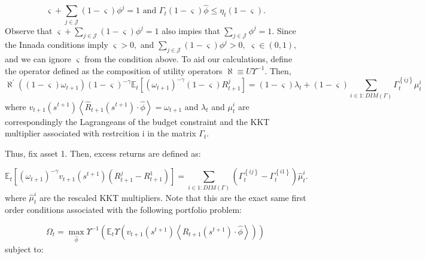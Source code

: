 \documentclass{article}
\begin{document}
\begin{equation*}
\varsigma +\sum_{j\in \mathcal{J}}\left( 1-\varsigma \right) \phi ^{j}=1%
\text{ and }\Gamma _{t}\left( 1-\varsigma \right) \hat{\phi}\leq \eta
_{t}\left( 1-\varsigma \right) .
\end{equation*}%
Observe that $\varsigma +\sum_{j\in \mathcal{J}}\left( 1-\varsigma \right)
\phi ^{j}=1$ also impies that $\sum_{j\in \mathcal{J}}\phi ^{j}=1.$ Since
the Innada conditions imply $\varsigma >0,$ and $\sum_{j\in \mathcal{J}%
}\left( 1-\varsigma \right) \phi ^{j}>0,$ $\varsigma \in \left( 0,1\right) ,$
and we can ignore $\varsigma $ from the condition above. To aid our
calculations, define the operator defined as the composition of utility
operators $\aleph \equiv U\Upsilon ^{-1}.$ Then,
\begin{equation*}
\aleph ^{\prime }\left( \left( 1-\varsigma \right) \omega _{t+1}\right)
\left( 1-\varsigma \right) ^{-\gamma }\mathbb{E}_{t}\left[ \left( \omega
_{t+1}\right) ^{-\gamma }\left( 1-\varsigma \right) R_{t+1}^{j}\right]
=\left( 1-\varsigma \right) \lambda _{t}+\left( 1-\varsigma \right)
\sum_{i\in 1:DIM\left( \Gamma \right) }\Gamma _{t}^{\left\{ ij\right\} }\mu
_{t}^{i}
\end{equation*}%
where $v_{t+1}\left( s^{t+1}\right) \left\langle \hat{R}_{t+1}\left(
s^{t+1}\right) \cdot \hat{\phi}\right\rangle =\omega _{t+1}$ and $\lambda
_{t}$ and $\mu _{t}^{i}$ are correspondingly the Lagrangeans of the budget
constraint and the KKT multiplier associated with restrcition i in the
matrix $\Gamma _{t}$.

Thus, fix asset 1. Then, excess returns are defined as:

\begin{equation*}
\mathbb{E}_{t}\left[ \left( \omega _{t+1}\right) ^{-\gamma }v_{t+1}\left(
s^{t+1}\right) \left( R_{t+1}^{j}-R_{t+1}^{1}\right) \right] =\sum_{i\in
1:DIM\left( \Gamma \right) }\left( \Gamma _{t}^{\left\{ ij\right\} }-\Gamma
_{t}^{\left\{ i1\right\} }\right) \hat{\mu}_{t}^{i}.
\end{equation*}%
where $\hat{\mu}_{t}^{i}$ are the rescaled KKT multipliers. Note that this
are the exact same first order conditions associated with the following
portfolio problem:

\begin{equation*}
\Omega _{t}=\max_{\hat{\phi}}\Upsilon ^{-1}\left( \mathbb{E}_{t}\Upsilon
\left( v_{t+1}\left( s^{t+1}\right) \left\langle \hat{R}_{t+1}\left(
s^{t+1}\right) \cdot \hat{\phi}\right\rangle \right) \right)
\end{equation*}%
subject to:
\end{document}
